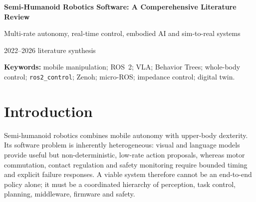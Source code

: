 \documentclass[10pt,a4paper]{article}
\begin{document}
\begin{center}
{\LARGE\bfseries Semi-Humanoid Robotics Software: A Comperehensive Literature Review\par}
\vspace{0.45em}
{\large Multi-rate autonomy, real-time control, embodied AI and sim-to-real systems\par}
\vspace{0.65em}
\small 2022--2026 literature synthesis
\end{center}

\begin{abstract}
Semi-humanoid mobile manipulators require software that connects semantic perception and language-conditioned action to contact-safe, deterministic physical execution. This review consolidates recent literature on Vision-Language-Action (VLA) models, perception--cognition--operation architectures, ROS~2 autonomy, Behavior Trees, whole-body planning, \texttt{ros2\_control}, Zenoh middleware, micro-ROS, variable-impedance control and OpenUSD digital twins. The literature supports a multi-rate architecture: cognitive inference at approximately 5--10Hz; mission, navigation and manipulation services at 30--100Hz; robot integration services at 100--500Hz; and native real-time control and safety at 1kHz. The principal research gap is not a missing algorithm in any one layer, but insufficiently specified contracts between layers: trajectory interpolation from VLA outputs, continuous base--arm coordination, jitter-isolated MCU control, containerised cloud-to-edge delivery, and tactile-force safety vetoes. A research agenda is presented around these interfaces, their benchmarks and reproducible evaluation.
\end{abstract}

\noindent\textbf{Keywords:} mobile manipulation; ROS~2; VLA; Behavior Trees; whole-body control; \texttt{ros2\_control}; Zenoh; micro-ROS; impedance control; digital twin.

\section{Introduction}
Semi-humanoid robotics combines mobile autonomy with upper-body dexterity. Its software problem is inherently heterogeneous: visual and language models provide useful but non-deterministic, low-rate action proposals, whereas motor commutation, contact regulation and safety monitoring require bounded timing and explicit failure responses. A viable system therefore cannot be an end-to-end policy alone; it must be a coordinated hierarchy of perception, task control, planning, middleware, firmware and safety.\cite{openvla,bonci,iovino}
\end{document}
